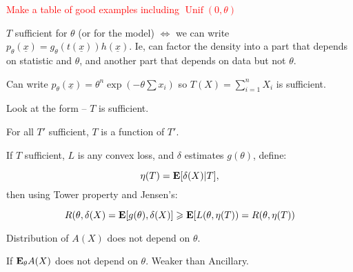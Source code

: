 \documentclass{article}
\newcommand\myworries[1]{\textcolor{red}{#1}}
\newcommand{\Unif}{\operatorname{Unif}}
\begin{document}
\myworries{Make a table of good examples including $\Unif(0,\theta)$}
\begin{theorem}
$T$ sufficient for $\theta$ (or for the model) $\iff$ we can write $p_\theta(\underline{x}) = g_\theta(t(\underline{x})) h(\underline{x})$. Ie, can factor the density into a part that depends on statistic and $\theta$, and another part that depends on data but not $\theta$. 
\begin{example}
Can write $p_\theta(\underline x) = \theta^n \exp(-\theta\sum x_i)$ so $T(X) = \sum_{i=1}^n X_i$ is sufficient.
\end{example}
\begin{example}
Look at the form -- $T$ is sufficient.
\end{example}


\end{theorem}
\begin{definition}
For all $T'$ sufficient, $T$ is a function of $T'$.
\end{definition}


\begin{theorem}
If $T$ sufficient, $L$ is any convex loss, and $\delta$ estimates $g(\theta)$, define:

$$\eta(T) = \mathbf{E}[\delta(X)|T],$$
then using Tower property and Jensen's:

$$R(\theta, \delta(X) = \mathbf{E}[g(\theta), \delta(X)] \geqslant \mathbf{E} [L(\theta, \eta(T)) = R(\theta, \eta(T))$$
\end{theorem}
\begin{definition}
Distribution of $A(X)$ does not depend on $\theta$.
\begin{definition}
If $\mathbf{E}_\theta A(X)$ does not depend on $\theta$. Weaker than Ancillary. 
\end{definition}
\end{definition}
\end{document}
